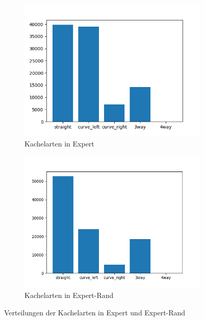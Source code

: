 \begin{figure}[H]
	\centering
	\begin{subfigure}[h]{0.5\textwidth}
		\centering
		\includegraphics[width=\linewidth]{kapitel4/images/plots/tiles-expert.png}
		\caption{Kachelarten in \glqq Expert\grqq}
		\label{expert-drive-tiles}
	\end{subfigure}%
	\begin{subfigure}[h]{0.5\textwidth}
		\centering
		\includegraphics[width=\linewidth]{kapitel4/images/plots/tiles-expert-rand.png}
		\caption{Kachelarten in \glqq Expert-Rand\grqq}
		\label{expert-rand-tiles}
	\end{subfigure}
	\caption{Verteilungen der Kachelarten in \glqq Expert\grqq{} und \glqq Expert-Rand\grqq}
	\label{expert-tiles}
\end{figure}


